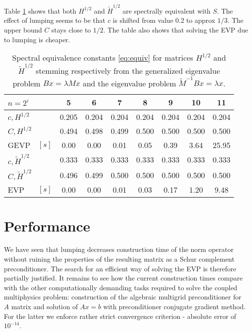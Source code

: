 \documentclass[10pt, a4paper]{article}
\begin{document}
Table \ref{tab:lump} shows that both $H^{1/2}$ and $\tilde{H}^{1/2}$ are
spectrally equivalent with $S$. The effect of lumping seems to be that $c$ is
shifted from value 0.2 to approx $1/3$. The upper bound $C$ stays close to
$1/2$. The table also shows that solving the EVP due to lumping is cheaper. 
%
\begin{table}[ht]
  \caption{Spectral equivalence constants \eqref{eq:equiv} for matrices
  $H^{1/2}$ and $\tilde{H}^{1/2}$ stemming respectively from the generalized
eigenvalue problem $Bx=\lambda M x$ and the eigenvalue problem
$\tilde{M}^{-1}Bx=\lambda x$.}
\label{tab:lump}
\footnotesize{
\begin{tabular}{lr|ccccccc}
\multicolumn{2}{l|}{$n=2^i$}              &     5 &     6 &     7 &     8 &     9 & 10    & 11\\
\hline
\multicolumn{2}{l|}{$c, H^{1/2}$}         & 0.205 & 0.204 & 0.204 & 0.204 & 0.204 & 0.204 & 0.204\\
\multicolumn{2}{l|}{$C, H^{1/2}$}         & 0.494 & 0.498 & 0.499 & 0.500 & 0.500 & 0.500 & 0.500\\
GEVP & $\left[s\right]$                   &  0.00 & 0.00  & 0.01  & 0.05  & 0.39  & 3.64  & 25.95\\
\hline
\multicolumn{2}{l|}{$c, \tilde{H}^{1/2}$} & 0.333 & 0.333 & 0.333 & 0.333 & 0.333 & 0.333 & 0.333\\
\multicolumn{2}{l|}{$C, \tilde{H}^{1/2}$} & 0.496 & 0.499 & 0.500 & 0.500 & 0.500 & 0.500 & 0.500\\
EVP & $\left[s\right]$                    & 0.00  & 0.00  & 0.01  & 0.03  & 0.17  & 1.20  & 9.48\\
\end{tabular}
}
\end{table}

\section*{Performance} We have seen that lumping decreases construction time of
the norm operator without ruining the properties of the resulting matrix as a
Schur complement preconditioner. The search for an efficient way of solving the
EVP is therefore partially justified. It remains to see how the current
construction times compare with the other computationally demanding tasks
required to solve the coupled multiphysics problem: construction of the
algebraic multigrid preconditioner for $A$ matrix and solution of $Ax=b$ with
preconditioner conjugate gradient method. For the latter we enforce rather
strict convergence criterion - absolute error of $10^{-14}$.
\end{document}
